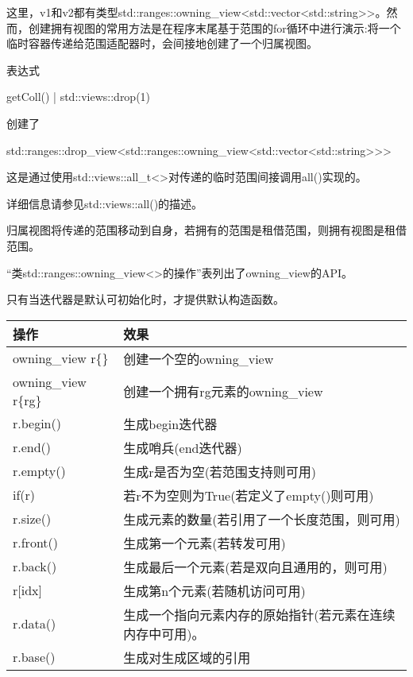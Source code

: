 这里，v1和v2都有类型std::ranges::owning\_view<std::vector<std::string>{}>。然而，创建拥有视图的常用方法是在程序末尾基于范围的for循环中进行演示:将一个临时容器传递给范围适配器时，会间接地创建了一个归属视图。

表达式

\begin{cpp}
getColl() | std::views::drop(1)
\end{cpp}

创建了

\begin{cpp}
std::ranges::drop_view<std::ranges::owning_view<std::vector<std::string>>>
\end{cpp}

这是通过使用std::views::all\_t<>对传递的临时范围间接调用all()实现的。

详细信息请参见std::views::all()的描述。



归属视图将传递的范围移动到自身，若拥有的范围是租借范围，则拥有视图是租借范围。


“类std::ranges::owning\_view<>的操作”表列出了owning\_view的API。

只有当迭代器是默认可初始化时，才提供默认构造函数。

\begin{longtable}[c]{|l|l|}
\hline
\textbf{操作}   & \textbf{效果}                                                \\ \hline
\endfirsthead
%
\endhead
%
owning\_view r\{\}   & 创建一个空的owning\_view                          \\ \hline
owning\_view r\{rg\} & 创建一个拥有rg元素的owning\_view           \\ \hline
r.begin()            & 生成begin迭代器                                      \\ \hline
r.end()              & 生成哨兵(end迭代器)                            \\ \hline
r.empty()            & 生成r是否为空(若范围支持则可用)  \\ \hline
if(r)                & 若r不为空则为True(若定义了empty()则可用)       \\ \hline
r.size() & 生成元素的数量(若引用了一个长度范围，则可用)                             \\ \hline
r.front()            & 生成第一个元素(若转发可用)              \\ \hline
r.back()             & 生成最后一个元素(若是双向且通用的，则可用) \\ \hline
r{[}idx{]}           & 生成第n个元素(若随机访问可用)            \\ \hline
r.data() & 生成一个指向元素内存的原始指针(若元素在连续内存中可用)。 \\ \hline
r.base()             & 生成对生成区域的引用                  \\ \hline
\end{longtable}

